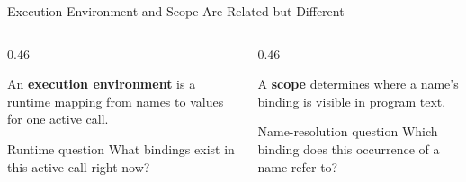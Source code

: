 \documentclass[aspectratio=169,10pt]{beamer}
\begin{document}

\begin{frame}{Execution Environment and Scope Are Related but Different}
  \begin{columns}[T,onlytextwidth]
    \begin{column}{0.46\textwidth}
      \begin{cpdefinition}
        An \textbf{execution environment} is a runtime mapping from names to values for one active call.
      \end{cpdefinition}

      \begin{block}{Runtime question}
        What bindings exist in this active call right now?
      \end{block}
    \end{column}

    \begin{column}{0.46\textwidth}
      \begin{cpdefinition}
        A \textbf{scope} determines where a name's binding is visible in program text.
      \end{cpdefinition}

      \begin{block}{Name-resolution question}
        Which binding does this occurrence of a name refer to?
      \end{block}
    \end{column}
  \end{columns}
\end{frame}
\end{document}
